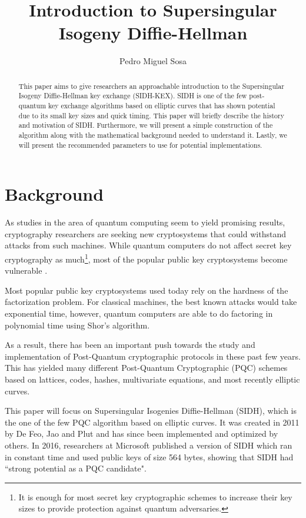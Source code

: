 \documentclass[10pt,twocolumn]{article} %
\title{Introduction to Supersingular Isogeny Diffie-Hellman}
\author{Pedro Miguel Sosa}
\begin{document}
\maketitle

\begin{abstract}
This paper aims to give researchers an approachable introduction to the Supersingular Isogeny Diffie-Hellman key exchange (SIDH-KEX). SIDH is one of the few post-quantum key exchange algorithms based on elliptic curves that has shown potential due to its small key sizes and quick timing. This paper will briefly describe the history and motivation of SIDH. Furthermore, we will present a simple construction of the algorithm along with the mathematical background needed to understand it. Lastly, we will present the recommended parameters to use for potential implementations.
\end{abstract}

\section{Background}
As studies in the area of quantum computing seem to yield promising results, cryptography researchers are seeking new cryptosystems that could withstand attacks from such machines. While quantum computers do not affect secret key cryptography as much\footnote{It is enough for most secret key cryptographic schemes to increase their key sizes to provide protection against quantum adversaries.}, most of the popular public key cryptosystems become vulnerable \cite{bernstein2009introduction}. 
\par Most popular public key cryptosystems used today rely on the hardness of the factorization problem. For classical machines, the best known attacks would take exponential time, however, quantum computers are able to do factoring in polynomial time using Shor's algorithm.
\par As a result, there has been an important push towards the study and implementation of Post-Quantum cryptographic protocols in these past few years. This has yielded many different Post-Quantum Cryptographic (PQC) schemes based on lattices, codes, hashes, multivariate equations, and most recently elliptic curves.
\par This paper will focus on Supersingular Isogenies Diffie-Hellman (SIDH), which is the one of the few PQC algorithm based on elliptic curves. It was created in 2011 by De Feo, Jao and Plut \cite{Jao2011} and has since been implemented and optimized by others. In 2016, researchers at Microsoft published a version of SIDH which ran in constant time and used public keys of size 564 bytes, showing that SIDH had ``strong potential as a PQC candidate"\cite{costello2016}.
\end{document}
